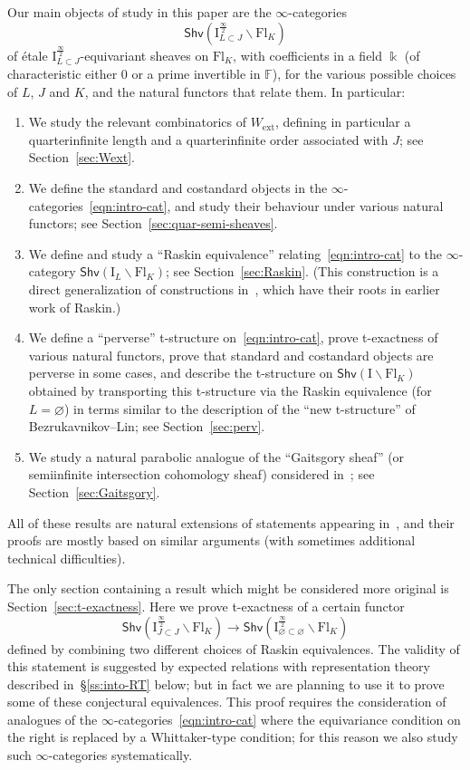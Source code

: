 \documentclass[11pt]{amsart}
\numberwithin{equation}{section}
\theoremstyle{plain}
\theoremstyle{definition}
\newcommand{\F}{{\mathbb F}}
\newcommand{\I}{{\mathrm I}}
\renewcommand{\k}{\Bbbk}
\newcommand{\semi}{{{\frac{\infty}{2}}}}
\newcommand{\ex}{\mathrm{ext}}
\newcommand{\Shv}{\mathsf{Shv}}
\newcommand{\Fl}{\mathrm{Fl}}
\begin{document}
Our main objects of study in this paper are the $\infty$-categories
\begin{equation}
\label{eqn:intro-cat}
\Shv \left( \I^\semi_{L \subset J} \backslash \Fl_K \right)
\end{equation}
of \'etale $\I^\semi_{L \subset J}$-equivariant sheaves on $\Fl_K$, with coefficients in a field $\k$ (of characteristic either $0$ or a prime invertible in $\F$), for the various possible choices of $L$, $J$ and $K$, and the natural functors that relate them. In particular:
\begin{enumerate}
\item
We study the relevant combinatorics of $W_\ex$, defining in particular a quarterinfinite length and a quarterinfinite order associated with $J$; see Section~\ref{sec:Wext}.
\item
We define the standard and costandard objects in the $\infty$-categories~\eqref{eqn:intro-cat}, and study their behaviour under various natural functors; see Section~\ref{sec:quar-semi-sheaves}.
\item
We define and study a ``Raskin equivalence'' relating~\eqref{eqn:intro-cat} to the $\infty$-category $\Shv \left( \I_{L} \backslash \Fl_K \right)$; see Section~\ref{sec:Raskin}. (This construction is a direct generalization of constructions in~\cite{Gaits18,adr,DL23}, which have their roots in earlier work of Raskin.)
\item
We define a ``perverse'' t-structure on~\eqref{eqn:intro-cat}, prove t-exactness of various natural functors, prove that standard and costandard objects are perverse in some cases, and describe the t-structure on $\Shv \left( \I \backslash \Fl_K \right)$ obtained by transporting this t-structure via the Raskin equivalence (for $L=\varnothing$) in terms similar to the description of the ``new t-structure'' of Bezrukavnikov--Lin; see Section~\ref{sec:perv}.
\item
We study a natural parabolic analogue of the ``Gaitsgory sheaf'' (or semiinfinite intersection cohomology sheaf) considered in~\cite{Gaits18,adr}; see Section~\ref{sec:Gaitsgory}.
\end{enumerate}
All of these results are natural extensions of statements appearing in~\cite{Gaits18,adr,DL23}, and their proofs are mostly based on similar arguments (with sometimes additional technical difficulties).

The only section containing a result which might be considered more original is Section~\ref{sec:t-exactness}. Here we prove t-exactness of a certain functor
\[
\Shv \left( \I^\semi_{J \subset J} \backslash \Fl_K \right) \to \Shv \left( \I^\semi_{\varnothing \subset \varnothing} \backslash \Fl_K \right)
\]
defined by combining two different choices of Raskin equivalences. The validity of this statement is suggested by expected relations with representation theory described in~\S\ref{ss:into-RT} below; but in fact we are planning to use it to prove some of these conjectural equivalences. This proof requires the consideration of analogues of the $\infty$-categories~\eqref{eqn:intro-cat} where the equivariance condition on the right is replaced by a Whittaker-type condition; for this reason we also study such $\infty$-categories systematically.
\end{document}
